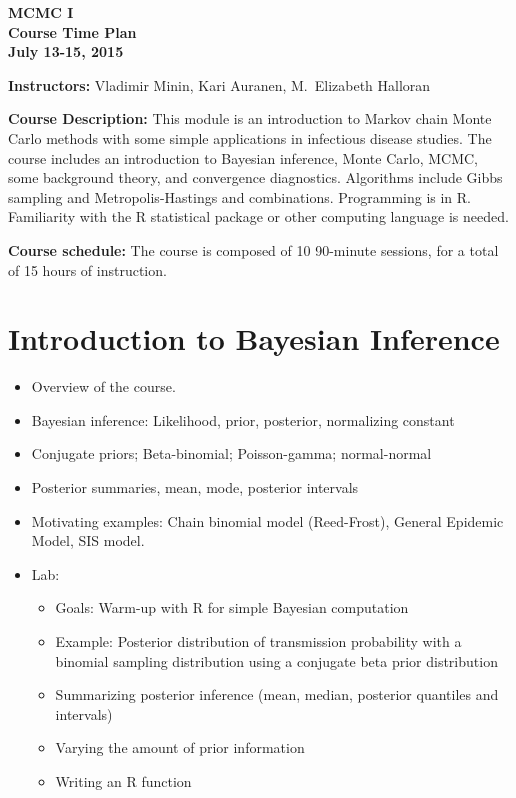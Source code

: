 \documentclass[11pt]{article}
\begin{document}

\addtolength{\baselineskip}{0.0\baselineskip}  
\pagestyle{myheadings} 

\begin{center}
{\bf  MCMC I \\
 Course Time Plan  \\
July 13-15, 2015}  
\end{center}

\vspace{.2cm}

\noindent
 {\bf Instructors:} Vladimir Minin,  Kari Auranen, M.\ Elizabeth Halloran\\

\vspace{.3cm}

\noindent
{\bf Course Description:} This module is an introduction to Markov chain Monte Carlo methods with some simple applications in infectious disease 
studies.  
 The course includes an introduction to 
 Bayesian inference, Monte Carlo, MCMC, some background theory, and convergence diagnostics. Algorithms include Gibbs sampling and Metropolis-Hastings and combinations. Programming is in R. 
 Familiarity with the R statistical package or other computing language is needed. 



\noindent
{\bf Course schedule:}
The course is composed of 10 90-minute sessions, for a total of 15 hours of instruction. 


\section{Introduction to Bayesian Inference} 
\begin{itemize} 
\item Overview of the course. 
\item Bayesian inference: Likelihood, prior, posterior, normalizing constant  
\item Conjugate priors; Beta-binomial; Poisson-gamma; normal-normal 
\item Posterior summaries, mean, mode,  posterior intervals   
\item Motivating examples: Chain binomial model (Reed-Frost), General Epidemic Model,  
SIS model.
\item {Lab: }
\begin{itemize}
\item Goals:  Warm-up with R for simple Bayesian computation
\item  Example: Posterior distribution of transmission probability with a binomial  sampling distribution using a conjugate beta prior distribution
\item Summarizing posterior inference (mean, median, posterior quantiles and intervals)
\item Varying the amount of prior information
\item Writing an R function
\end{itemize}
\end{itemize}
\end{document}
